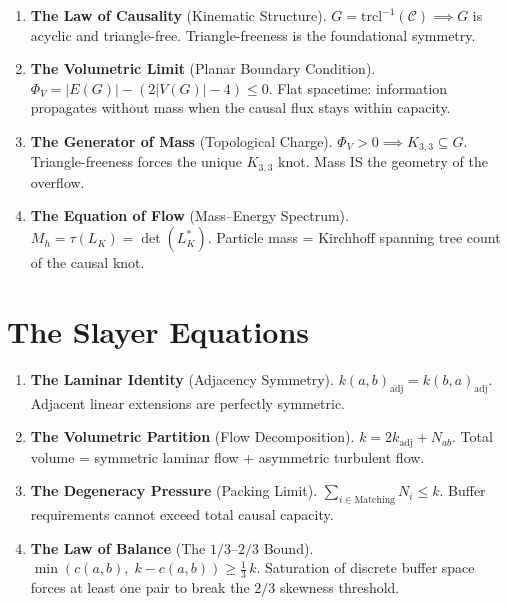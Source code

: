 \documentclass[11pt, a4paper, openany]{book}
\begin{document}
\begin{enumerate}[label=\textbf{\Roman*.}, leftmargin=2.5em]
\item \textbf{The Law of Causality} (Kinematic Structure).
$G = \mathrm{trcl}^{-1}(\mathcal{C}) \implies G$ is acyclic and
triangle-free. Triangle-freeness is the foundational symmetry.

\item \textbf{The Volumetric Limit} (Planar Boundary Condition).
$\Phi_V = |E(G)| - (2|V(G)| - 4) \leq 0$.
Flat spacetime: information propagates without mass when the causal
flux stays within capacity.

\item \textbf{The Generator of Mass} (Topological Charge).
$\Phi_V > 0 \implies K_{3,3} \subseteq G$.
Triangle-freeness forces the unique $K_{3,3}$ knot. Mass IS the
geometry of the overflow.

\item \textbf{The Equation of Flow} (Mass--Energy Spectrum).
$M_h = \tau(L_K) = \det(L_K^*)$.
Particle mass = Kirchhoff spanning tree count of the causal knot.
\end{enumerate}

\section*{The Slayer Equations}

\begin{enumerate}[label=\textbf{\Roman*.}, leftmargin=2.5em]
\item \textbf{The Laminar Identity} (Adjacency Symmetry).
$k(a,b)_{\mathrm{adj}} = k(b,a)_{\mathrm{adj}}$.
Adjacent linear extensions are perfectly symmetric.

\item \textbf{The Volumetric Partition} (Flow Decomposition).
$k = 2k_{\mathrm{adj}} + N_{ab}$.
Total volume = symmetric laminar flow + asymmetric turbulent flow.

\item \textbf{The Degeneracy Pressure} (Packing Limit).
$\sum_{i \in \mathrm{Matching}} N_i \leq k$.
Buffer requirements cannot exceed total causal capacity.

\item \textbf{The Law of Balance} (The $1/3$--$2/3$ Bound).
$\min(c(a,b),\; k - c(a,b)) \geq \frac{1}{3}\,k$.
Saturation of discrete buffer space forces at least one pair to break
the $2/3$ skewness threshold.
\end{enumerate}
\end{document}
